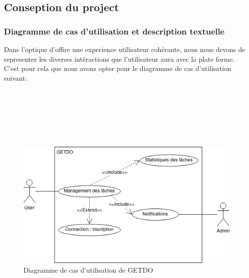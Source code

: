 \documentclass[a4paper,12pt]{report}
\begin{document}
\subsection{Conseption du project}
\subsubsection{Diagramme de cas d'utilisation et description textuelle}
Dans l'optique d'offire une experience utilisateur cohérante, nous nous devons de representer les diverses intéractions que l'utilisateur aura avec la plate forme. C'est pour cela que nous avons opter pour le diagramme de cas d'utilisation suivant: \\ \\ \\ \\ \\ \\ \\

\begin{figure}[h!]
    \includegraphics[width=1\textwidth]{./images/Diagramme_useCase.drawio.png}
    \caption{Diagramme de cas d'utilisation de GETDO}
    \label{fig:GETDO_UseCaseDiagramm}
\end{figure}
\end{document}
